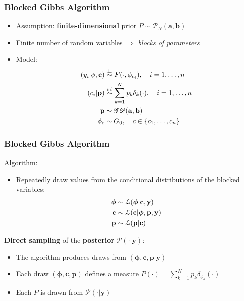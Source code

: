 \begin{frame}
	\frametitle{Blocked Gibbs Algorithm}
	\begin{itemize}
	    \item Assumption: \textbf{finite-dimensional} prior $P \sim  \mathscr{P}_{N}(\mathbf{a},\mathbf{b})$
        \item Finite number of random variables $\Rightarrow$ \textit{blocks of parameters}
        \item Model:
        \begin{align*}
            (y_{i}|\mathbf{\phi},\mathbf{c})&\indsim F(\cdot,\phi_{c_{i}}), \quad i=1,\dots,n \\
            (c_{i}|\mathbf{p})&\iidsim\sum\limits_{k=1}^N \mathit{p_{k}}\delta_{k}(\cdot), \quad i=1,\dots,n \\
            \mathbf{p} &\sim \mathscr{GD}(\mathbf{a},\mathbf{b}) \\
            \mathbf{\phi}_{c} & \sim G_{0}, \quad c \in \{c_1,\dots, c_n\}
        \end{align*}



	\end{itemize}
\end{frame}




\begin{frame}
	\frametitle{Blocked Gibbs Algorithm}
	Algorithm:
	\begin{itemize}
		\item Repeatedly draw values from the conditional distributions of the blocked variables:
		\begin{align*}
			\boldsymbol\phi &\sim \mathcal L(\boldsymbol\phi | \mathbf{c}, \mathbf{y}) \\
			\mathbf{c} &\sim \mathcal L (\mathbf{c}| \boldsymbol\phi,\mathbf{p}, \mathbf{y}) \\
			\mathbf{p} &\sim \mathcal L (\mathbf{p}| \mathbf{c})
		\end{align*}
	\end{itemize}
	\textbf{Direct sampling} of the \textbf{posterior} $\mathscr{P}(\cdot|\mathbf{y})$:
	\begin{itemize}
    	\item The algorithm produces draws from $(\boldsymbol\phi,\mathbf{c},\mathbf{p}| \mathbf{y})$
		\item Each draw $(\boldsymbol\phi,\mathbf{c},\mathbf{p})$ defines a measure $P(\cdot)= \sum\limits_{k=1}^N  \mathit{p_{k}}\delta_{\phi_{k}}(\cdot) $ %
		\item Each $P$ is drawn from $\mathscr{P}(\cdot|\mathbf{y})$
	\end{itemize}
\end{frame}

